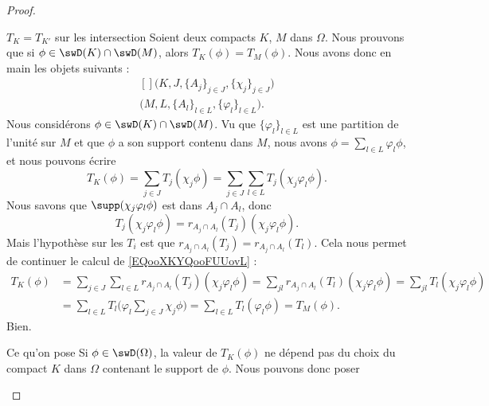 \begin{proof}
\begin{subproof}
    \item[$T_K=T_{K'}  $ sur les intersection]
        Soient deux compacts \( K\), \( M\) dans \( \Omega\). Nous prouvons que si \( \phi\in\swD(K)\cap\swD(M)\), alors \( T_{K}(\phi)=T_{M}(\phi)\). Nous avons donc en main les objets suivants :
        \begin{equation}
            \begin{aligned}[]
                \big( K, J, \{ A_j \}_{j\in J}, \{ \chi_j \}_{j\in J} \big)\\
                \big( M, L, \{ A_l \}_{l\in L}, \{ \varphi_l \}_{l\in L} \big).
            \end{aligned}
        \end{equation}
        Nous considérons \( \phi\in\swD(K)\cap\swD(M)\). Vu que \(\{ \varphi_l \}_{l\in L} \) est une partition de l'unité sur \( M\) et que \( \phi\) a son support contenu dans \( M\), nous avons \( \phi=\sum_{l\in L}\varphi_l\phi\), et nous pouvons écrire
        \begin{equation}        \label{EQooXKYQooFUUovL}
            T_K(\phi)=\sum_{j\in J}T_j(\chi_j\phi)=\sum_{j\in J}\sum_{l\in L}T_j(\chi_j\varphi_l\phi).
        \end{equation}
        Nous savons que \( \supp(\chi_j\varphi_l\phi)\) est dans \( A_j\cap A_l\), donc 
        \begin{equation}
            T_j(\chi_j\varphi_l\phi)=r_{A_j\cap A_l}(T_j)(\chi_j\varphi_l\phi).
        \end{equation}
        Mais l'hypothèse sur les \( T_i\) est que \( r_{A_j\cap A_l}(T_j)=r_{A_j\cap A_l}(T_l)\). Cela nous permet de continuer le calcul de \eqref{EQooXKYQooFUUovL} :
        \begin{subequations}
            \begin{align}
                T_K(\phi)&=\sum_{j\in J}\sum_{l\in L}r_{A_j\cap A_l}(T_j)(\chi_j\varphi_l\phi)
                =\sum_{jl}r_{A_j\cap A_l}(T_l)(\chi_j\varphi_l\phi)
                =\sum_{jl}T_l(\chi_j\varphi_l\phi)\\
                &=\sum_{l\in L}T_l\big( \varphi_l\sum_{j\in J}\chi_j\phi \big)
                =\sum_{l\in L}T_l(\varphi_l\phi)
                =T_M(\phi).
            \end{align}
        \end{subequations}
        Bien.
    \item[Ce qu'on pose]
        Si \( \phi\in \swD(\Omega)\), la valeur de \( T_K(\phi)\) ne dépend pas du choix du compact \( K\) dans \( \Omega\) contenant le support de \( \phi\). Nous pouvons donc poser

\end{subproof}
\end{proof}
